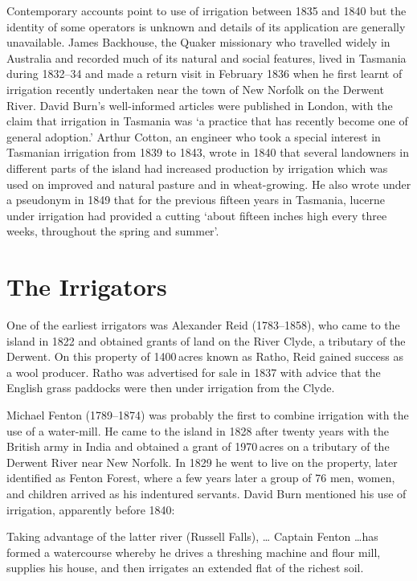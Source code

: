 Contemporary accounts point to use of irrigation between 1835 and 1840
but the identity of some operators is unknown and details of its
application are generally unavailable.  James
Backhouse, the Quaker missionary who travelled
widely in Australia and recorded much of its natural and social
features, lived in Tasmania during 1832--34 and made a return visit in
February 1836 when he first learnt of irrigation recently undertaken
near the town of New Norfolk on the Derwent
River. David Burn's well-informed
articles were published in London, with the claim that irrigation in
Tasmania was `a practice that has recently become one of general
adoption.'  Arthur Cotton, an engineer who took a
special interest in Tasmanian irrigation from 1839 to 1843, wrote in
1840 that several landowners in different parts of the island had
increased production by irrigation which was used on improved and
natural pasture and in wheat-growing.  He
also wrote under a pseudonym in 1849 that for the previous fifteen
years in Tasmania, lucerne under irrigation had
provided a cutting `about fifteen inches high every three weeks,
throughout the spring and summer'.

\section*{The Irrigators}

One of the earliest irrigators was Alexander Reid
(1783--1858), who came to the island in 1822 and obtained grants of
land on the River Clyde, a tributary of the
Derwent. On this property of 1400\,acres known as Ratho, Reid gained success as a wool producer.  Ratho was
advertised for sale in 1837 with advice that the English grass
paddocks were then under irrigation from the Clyde.

Michael Fenton (1789--1874) was probably the first
to combine irrigation with the use of a water-mill.
 He came to the island in 1828 after
twenty years with the British army in India and obtained a grant of
1970\,acres on a tributary of the Derwent River near New
Norfolk. In 1829 he went to live on the
property, later identified as Fenton Forest, where a few years later a
group of 76 men, women, and children arrived as his indentured
servants.  David Burn mentioned his use of irrigation, apparently
before 1840:
\begin{Quote}
	Taking advantage of the latter river (Russell Falls), \ldots
	Captain Fenton \ldots has formed a watercourse whereby he
	drives a threshing machine and flour mill, supplies his house,
	and then irrigates an extended flat of the richest
	soil.
\end{Quote}

